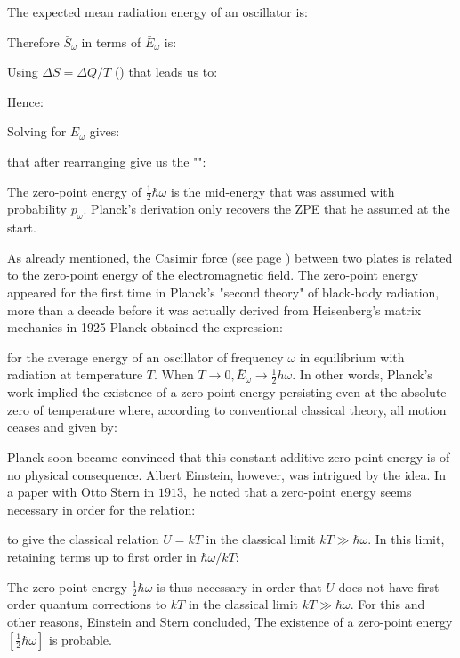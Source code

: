 	The expected mean radiation energy of an oscillator is:
	
	Therefore $\bar{S}_\omega$ in terms of $\bar{E}_\omega$ is:
	
	Using $\Delta S=\Delta Q/T$ () that leads us to:
	
	Hence:
	
	Solving for $\bar{E}_\omega$ gives:
	
	that after rearranging give us the "":
	
	The zero-point energy of $\frac{1}{2} \hbar \omega$ is the mid-energy that was assumed with probability $p_{\omega}$. Planck's derivation only recovers
the ZPE that he assumed at the start.
	
	As already mentioned, the Casimir force (see page \pageref{electromagnetic Casimir Force}) between two plates is related to the zero-point energy of the electromagnetic field. The zero-point energy appeared for the first time in Planck's "second theory" of black-body radiation, more than a decade before it was actually derived from Heisenberg's matrix mechanics in 1925 Planck obtained the expression:
	
	for the average energy of an oscillator of frequency $\omega$ in equilibrium with radiation at temperature $T$. When $T \rightarrow 0, \bar{E}_{\omega} \rightarrow \frac{1}{2} h \omega .$ In other words, Planck's work implied the existence of a zero-point energy persisting even at the absolute zero of temperature where, according to conventional classical theory, all motion ceases and given by:
	
	Planck soon became convinced that this constant additive zero-point energy is of no physical consequence. Albert Einstein, however, was intrigued by the idea. In a paper with Otto Stern in $1913,$ he noted that a zero-point energy seems necessary in order for the relation:
	
	to give the classical relation $U=k T$ in the classical limit $k T \gg \hbar \omega$. In this limit, retaining terms up to first order in $\hbar \omega / k T$:
	
	The zero-point energy $\frac{1}{2}\hbar \omega$ is thus necessary in order that $U$ does not have first-order quantum corrections to $k T$ in the classical limit $k T \gg \hbar \omega .$ For this and other reasons, Einstein and Stern concluded, The existence of a zero-point energy $\left[\frac{1}{2} \hbar \omega\right]$ is probable.
	
